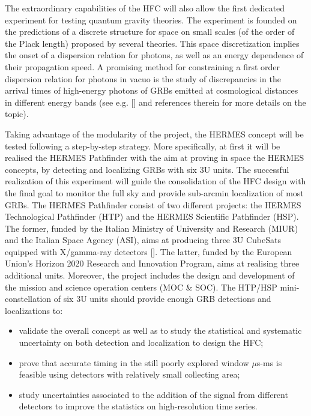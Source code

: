 \documentclass[]{spie}  %
\begin{document}
The extraordinary capabilities of the HFC will also allow the first dedicated experiment for testing quantum gravity theories. The experiment is founded on the predictions of a discrete structure for space on small scales (of the order of the Plack length) proposed by several theories. This space discretization implies the onset of a dispersion relation for photons, as well as an energy dependence of their propagation speed. A promising method for constraining a first order dispersion relation for photons in vacuo is the study of discrepancies in the arrival times of high-energy photons of GRBs emitted at cosmological distances in different energy bands (see e.g. [] and references therein for more details on the topic).

Taking advantage of the modularity of the project, the HERMES concept will be tested following a step-by-step strategy. More specifically, at first it will be realised the HERMES Pathfinder with the aim at proving in space the HERMES concepts, by detecting and localizing GRBs with six 3U units. The successful realization of this experiment will guide the consolidation of the HFC design with the final goal to monitor the full sky and provide sub-arcmin localization of most GRBs.
The HERMES Pathfinder consist of two different projects: the HERMES Technological Pathfinder (HTP) and the HERMES Scientific Pathfinder (HSP). The former, funded by the Italian Ministry of University and Research (MIUR) and the Italian Space Agency (ASI), aims at producing three 3U CubeSats equipped with X/gamma-ray detectors []. The latter, funded by the European Union’s Horizon 2020 Research and Innovation Program, aims at realising three additional units. Moreover, the project includes the design and development of the mission and science operation centers (MOC \& SOC). 
The HTP/HSP mini-constellation of six 3U units should provide enough GRB detections and localizations to:
\begin{itemize}
	\item validate the overall concept as well as to study the statistical and systematic uncertainty on both detection and localization to design the HFC;\\ 
	\item prove that accurate timing in the still poorly explored window $\mu$s-ms is feasible using detectors with relatively small collecting area;\\
	\item study uncertainties associated to the addition of the signal from different detectors to improve the statistics on high-resolution time series. 
\end{itemize}
\end{document}
